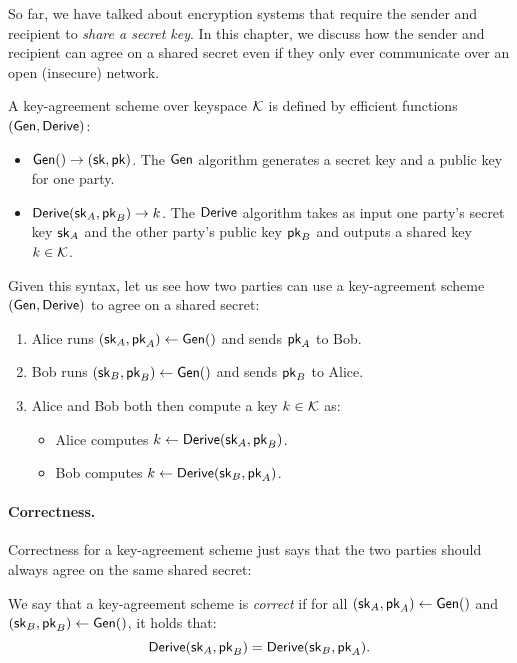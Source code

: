 So far, we have talked about encryption systems that require
the sender and recipient to \emph{share a secret key}.
In this chapter, we discuss how the sender and recipient
can agree on a shared secret even if they only ever communicate
over an open (insecure) network.

A key-agreement scheme over keyspace $\mathcal{K}$ is defined by efficient functions $(\mathsf{Gen}, \mathsf{Derive})$:
\begin{itemize}[noitemsep]
  \item $\mathsf{Gen}() \to ({\mathsf{sk}}, \mathsf{pk})$. The $\mathsf{Gen}$ algorithm 
    generates a secret key and a public key for one party.
  \item $\mathsf{Derive}({\mathsf{sk}}_A, \mathsf{pk}_B) \to k$. The $\mathsf{Derive}$ algorithm
    takes as input one party's secret key ${\mathsf{sk}}_A$ and the
    other party's public key $\mathsf{pk}_B$ and outputs a shared
    key $k \in \mathcal{K}$.
\end{itemize}

Given this syntax, let us see how two parties can use a key-agreement 
scheme $(\mathsf{Gen}, \mathsf{Derive})$ to agree on a shared secret:
\begin{enumerate}[noitemsep]
  \item Alice runs $({\mathsf{sk}}_A, \mathsf{pk}_A) \gets \mathsf{Gen}()$ and sends $\mathsf{pk}_A$ to Bob.
  \item Bob runs $({\mathsf{sk}}_B, \mathsf{pk}_B) \gets \mathsf{Gen}()$ and sends $\mathsf{pk}_B$ to Alice.
	\item Alice and Bob both then compute a key $k \in \mathcal{K}$ as:
		\begin{itemize}
      \item Alice computes $k \gets \mathsf{Derive}({\mathsf{sk}}_A, \mathsf{pk}_B)$.
      \item Bob computes $k \gets \mathsf{Derive}({\mathsf{sk}}_B, \mathsf{pk}_A)$.
		\end{itemize}
\end{enumerate}


\paragraph{Correctness.} 
Correctness for a key-agreement scheme just says that the two parties
should always agree on the same shared secret:

\begin{definition}
We say that a key-agreement scheme is \emph{correct} if
for all 
$({\mathsf{sk}}_A, \mathsf{pk}_A) \gets \mathsf{Gen}()$ and
$({\mathsf{sk}}_B, \mathsf{pk}_B) \gets \mathsf{Gen}()$, it holds that: 
\[ \mathsf{Derive}({\mathsf{sk}}_A, \mathsf{pk}_B) = \mathsf{Derive}({\mathsf{sk}}_B, \mathsf{pk}_A). \]
\end{definition}

